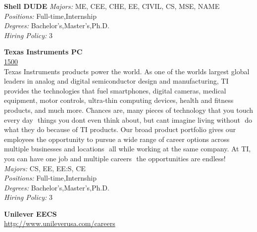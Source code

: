 \documentclass[twoside]{article}
\begin{document}
\begin{center}
\begin{multicols}{2}
\begin{minipage}{.95\columnwidth}{\Large\bf Shell \hfill DUDE}
    \emph{Majors:} ME, CEE, CHE, EE, CIVIL, CS, MSE, NAME\\
    \emph{Positions:} Full-time,Internship\\
    \emph{Degrees:} Bachelor's,Master's,Ph.D.\\
    \emph{Hiring Policy:} 3\\
\end{minipage}
 \begin{minipage}{.95\columnwidth}{\Large\bf Texas Instruments \hfill PC}\\
    \url{1500}\\
    Texas Instruments products power the world. As one of the worlds largest global leaders in analog and digital semiconductor design and manufacturing, TI provides the technologies that fuel smartphones, digital cameras, medical equipment, motor controls, ultra-thin computing devices, health and fitness products, and much more. Chances are, many pieces of technology that you touch every day  things you dont even think about, but cant imagine living without  do what they do because of TI products. Our broad product portfolio gives our employees the opportunity to pursue a wide range of career options across multiple businesses and locations  all while working at the same company. At TI, you can have one job and multiple careers  the opportunities are endless!\\
    \emph{Majors:} CS, EE, EE:S, CE\\
    \emph{Positions:} Full-time,Internship\\
    \emph{Degrees:} Bachelor's,Master's,Ph.D.\\
    \emph{Hiring Policy:} 3\\
\end{minipage}
 \begin{minipage}{.95\columnwidth}{\Large\bf Unilever \hfill EECS}\\
    \url{http://www.unileverusa.com/careers}\\

\end{minipage}
\end{multicols}
\end{center}
\end{document}
